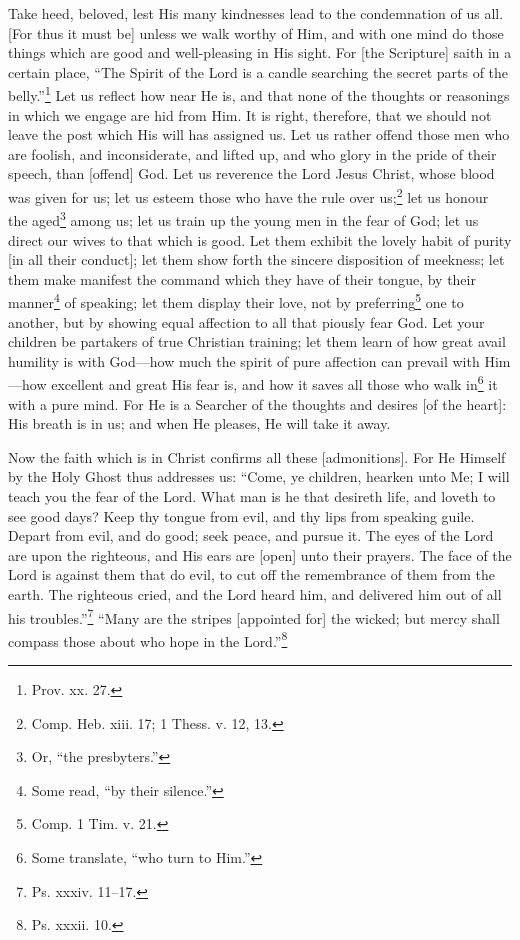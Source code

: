 Take heed, beloved, lest His many kindnesses lead to the condemnation of us all. [For thus it must be] unless we walk worthy of Him, and with one mind do those things which are good and well-pleasing in His sight. For [the Scripture] saith in a certain place, “The Spirit of the Lord is a candle searching the secret parts of the belly.”\footnote{Prov. xx. 27.} Let us reflect how near He is, and that none of the thoughts or reasonings in which we engage are hid from Him. It is right, therefore, that we should not leave the post which His will has assigned us. Let us rather offend those men who are foolish, and inconsiderate, and lifted up, and who glory in the pride of their speech, than [offend] God. Let us reverence the Lord Jesus Christ, whose blood was given for us; let us esteem those who have the rule over us;\footnote{Comp. Heb. xiii. 17; 1 Thess. v. 12, 13.} let us honour the aged\footnote{Or, “the presbyters.”} among us; let us train up the young men in the fear of God; let us direct our wives to that which is good. Let them exhibit the lovely habit of purity [in all their conduct]; let them show forth the sincere disposition of meekness; let them make manifest the command which they have of their tongue, by their manner\footnote{Some read, “by their silence.”} of speaking; let them display their love, not by preferring\footnote{Comp. 1 Tim. v. 21.} one to another, but by showing equal affection to all that piously fear God. Let your children be partakers of true Christian training; let them learn of how great avail humility is with God—how much the spirit of pure affection can prevail with Him—how excellent and great His fear is, and how it saves all those who walk in\footnote{Some translate, “who turn to Him.”} it with a pure mind. For He is a Searcher of the thoughts and desires [of the heart]: His breath is in us; and when He pleases, He will take it away.


Now the faith which is in Christ confirms all these [admonitions]. For He Himself by the Holy Ghost thus addresses us: “Come, ye children, hearken unto Me; I will teach you the fear of the Lord. What man is he that desireth life, and loveth to see good days? Keep thy tongue from evil, and thy lips from speaking guile. Depart from evil, and do good; seek peace, and pursue it. The eyes of the Lord are upon the righteous, and His ears are [open] unto their prayers. The face of the Lord is against them that do evil, to cut off the remembrance of them from the earth. The righteous cried, and the Lord heard him, and delivered him out of all his troubles.”\footnote{Ps. xxxiv. 11–17.} “Many are the stripes [appointed for] the wicked; but mercy shall compass those about who hope in the Lord.”\footnote{Ps. xxxii. 10.}

